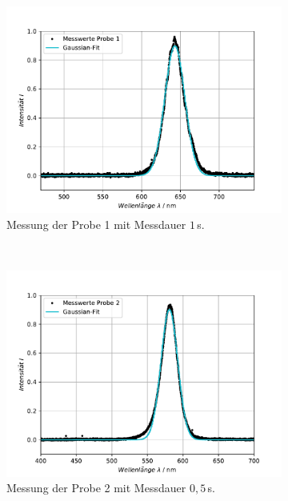 \begin{figure}[H]
\centering
	\begin{subfigure}[t]{0.4\textwidth}
	\includegraphics[width=\textwidth]{Plots/aufgabe1a_P1.pdf}
	\caption{Messung der Probe 1 mit Messdauer $1 \,$s.}
	\label{abb:A1_P1}
	\end{subfigure}
	~
	\begin{subfigure}[t]{0.4\textwidth}
	\includegraphics[width=\textwidth]{Plots/aufgabe1a_P2.pdf}
	\caption{Messung der Probe 2 mit Messdauer $0,5 \,$s.}
	\label{abb:A1_P2}
	\end{subfigure}
	~
	\begin{subfigure}[t]{0.4\textwidth}

\end{subfigure}
\end{figure}
